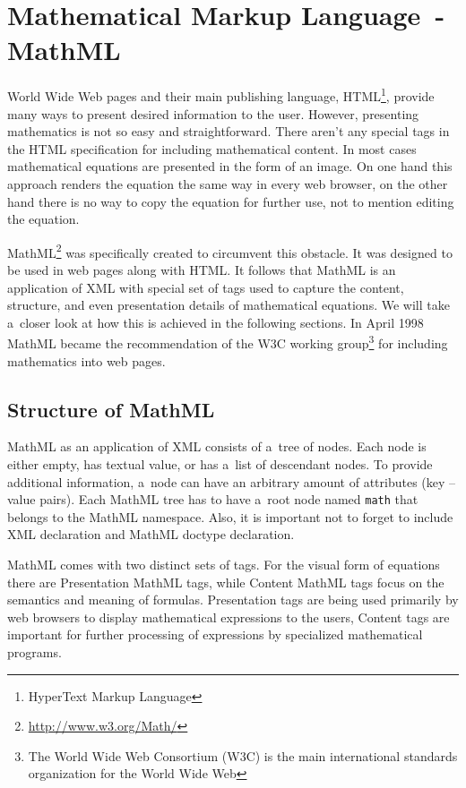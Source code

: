 \documentclass[11pt,oneside,final]{fithesis2}
\def\s#1{#1\index{#1}}
\begin{document}
\chapter{Mathematical Markup Language~- MathML}
\label{chapter:mathml}
World Wide Web pages and their main publishing language, \s{HTML}\footnote{HyperText Markup Language}, provide many ways to present desired information to the user. However, presenting mathematics is not so easy and straightforward. There aren't any special tags in the HTML specification for including mathematical content. In most cases mathematical equations are presented in the form of an image. On one hand this approach renders the equation the same way in every web browser, on the other hand there is no way to copy the equation for further use, not to mention editing the equation. 

\s{MathML}\footnote{\url{http://www.w3.org/Math/}} was specifically created to circumvent this obstacle. It was designed to be used in web pages along with HTML. It follows that MathML is an application of XML with special set of tags used to capture the content, structure, and even presentation details of mathematical equations. We will take a~closer look at how this is achieved in the following sections. In April 1998 MathML became the recommendation of the \s{W3C} working group\footnote{The World Wide Web Consortium (W3C) is the main international standards organization for the World Wide Web} for including mathematics into web pages.

\section{Structure of MathML}
MathML as an application of XML consists of a~tree of nodes. Each node is either empty, has textual value, or has a~list of descendant nodes. To provide additional information, a~node can have an arbitrary amount of attributes (key – value pairs). Each MathML tree has to have a~root node named \texttt{math} that belongs to the MathML namespace. Also, it is important not to forget to include XML declaration and MathML doctype declaration. 

MathML comes with two distinct sets of tags. For the visual form of equations there are Presentation MathML tags, while Content MathML tags focus on the semantics and meaning of formulas. Presentation tags are being used primarily by web browsers to display mathematical expressions to the users, Content tags are important for further processing of expressions by specialized mathematical programs.
\end{document}

